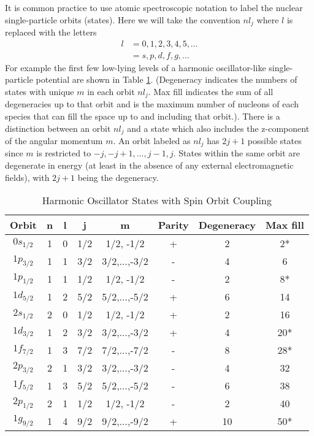 It is common practice to use atomic spectroscopic notation to label the nuclear
single-particle orbits (states). Here we will take the convention $nl_j$ where
$l$ is replaced with the letters
\begin{equation}\begin{split}
       l &= 0,1,2,3,4,5,...\\
         &= s,p,d,f,g,...
\end{split}\end{equation}
For example the first few low-lying levels of a harmonic oscillator-like single-particle
potential are shown in Table \ref{spo}. (Degeneracy indicates the numbers of states with unique $m$ in each orbit $nl_j$.
    Max fill indicates the sum of all degeneracies up to that orbit and is the maximum
    number of nucleons of each species that can fill the space up to and including that orbit.). There is a distinction between an orbit $nl_j$ and a state which also includes the 
z-component of the angular momentum $m$. An orbit labeled as $nl_j$ has $2j+1$ possible
states since $m$ is restricted to $-j, -j+1, ..., j-1, j$. States within the same orbit are degenerate 
in energy (at least in the absence of any external electromagnetic fields), with $2j+1$ being the
degeneracy.
\begin{table}
    \caption{Harmonic Oscillator States with Spin Orbit Coupling 
    }
    \label{spo}


\begin{tabular}
    {c c c c c c c c}
    \hline 
    \hline
Orbit     & n & l & j   & m         & Parity & Degeneracy & Max fill  \\
    \hline
$0s_{1/2}$& 1 & 0 & 1/2 & 1/2, -1/2 & + & 2 & 2* \\
    \hline
$1p_{3/2}$& 1 & 1 & 3/2 & 3/2,...,-3/2 & - & 4 & 6 \\
$1p_{1/2}$& 1 & 1 & 1/2 & 1/2, -1/2    & - & 2 & 8* \\
    \hline
$1d_{5/2}$& 1 & 2 & 5/2 & 5/2,...,-5/2 & + & 6  & 14   \\
$2s_{1/2}$& 2 & 0 & 1/2 & 1/2, -1/2    & + & 2  & 16  \\
$1d_{3/2}$& 1 & 2 & 3/2 & 3/2,...,-3/2 & + & 4  & 20*  \\
    \hline
$1f_{7/2}$& 1 & 3 & 7/2 & 7/2,...,-7/2 & - & 8 & 28* \\
    \hline
$2p_{3/2}$& 2 & 1 & 3/2 & 3/2,...,-3/2 & - & 4 & 32 \\
$1f_{5/2}$& 1 & 3 & 5/2 & 5/2,...,-5/2 & - & 6 & 38 \\
$2p_{1/2}$& 2 & 1 & 1/2 & 1/2,    -1/2 & - & 2 & 40 \\
$1g_{9/2}$& 1 & 4 & 9/2 & 9/2,...,-9/2 & + & 10& 50* \\
    \hline
    \hline

\end{tabular} 

\end{table} 

